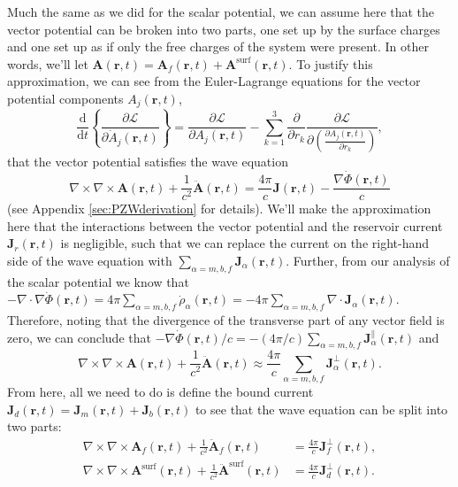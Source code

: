 \documentclass{article}
\begin{document}
Much the same as we did for the scalar potential, we can assume here that the vector potential can be broken into two parts, one set up by the surface charges and one set up as if only the free charges of the system were present. In other words, we'll let $\mathbf{A}(\mathbf{r},t) = \mathbf{A}_f(\mathbf{r},t) + \mathbf{A}^\mathrm{surf}(\mathbf{r},t)$. To justify this approximation, we can see from the Euler-Lagrange equations for the vector potential components $A_j(\mathbf{r},t)$,
\begin{equation}
\frac{\mathrm{d}}{\mathrm{d}t}\left\{\frac{\partial \mathcal{L}}{\partial \dot{A}_j(\mathbf{r},t)}\right\} = \frac{\partial \mathcal{L}}{\partial A_j(\mathbf{r},t)} - \sum_{k = 1}^3\frac{\partial}{\partial r_k}\frac{\partial \mathcal{L}}{\partial\!\left(\frac{\partial A_j(\mathbf{r},t)}{\partial r_k}\right)},
\end{equation}
that the vector potential satisfies the wave equation
\begin{equation}
\nabla\times\nabla\times\mathbf{A}(\mathbf{r},t) + \frac{1}{c^2}\ddot{\mathbf{A}}(\mathbf{r},t) = \frac{4\pi}{c}\mathbf{J}(\mathbf{r},t) - \frac{\nabla\dot{\Phi}(\mathbf{r},t)}{c}
\end{equation}
(see Appendix \ref{sec:PZWderivation} for details). We'll make the approximation here that the interactions between the vector potential and the reservoir current $\mathbf{J}_r(\mathbf{r},t)$ is negligible, such that we can replace the current on the right-hand side of the wave equation with $\sum_{\alpha = m,b,f}\mathbf{J}_\alpha(\mathbf{r},t)$. Further, from our analysis of the scalar potential we know that $-\nabla\cdot\nabla\dot{\Phi}(\mathbf{r},t) = 4\pi\sum_{\alpha = m,b,f}\dot{\rho}_\alpha(\mathbf{r},t) = -4\pi\sum_{\alpha = m,b,f}\nabla\cdot\mathbf{J}_\alpha(\mathbf{r},t)$. Therefore, noting that the divergence of the transverse part of any vector field is zero, we can conclude that $-\nabla\dot{\Phi}(\mathbf{r},t)/c = -(4\pi/c)\sum_{\alpha = m,b,f}\mathbf{J}^\parallel_\alpha(\mathbf{r},t)$ and
\begin{equation}
\nabla\times\nabla\times\mathbf{A}(\mathbf{r},t) + \frac{1}{c^2}\ddot{\mathbf{A}}(\mathbf{r},t) \approx \frac{4\pi}{c}\sum_{\alpha = m,b,f}\mathbf{J}^\perp_{\alpha}(\mathbf{r},t).
\end{equation}
From here, all we need to do is define the bound current $\mathbf{J}_d(\mathbf{r},t) = \mathbf{J}_m(\mathbf{r},t) + \mathbf{J}_b(\mathbf{r},t)$ to see that the wave equation can be split into two parts:
\begin{equation}\label{eq:vectorPotentialSplit}
\begin{split}
\nabla\times\nabla\times\mathbf{A}_f(\mathbf{r},t) + \frac{1}{c^2}\ddot{\mathbf{A}}_f(\mathbf{r},t) &= \frac{4\pi}{c}\mathbf{J}^\perp_f(\mathbf{r},t),\\
\nabla\times\nabla\times\mathbf{A}^\mathrm{surf}(\mathbf{r},t) + \frac{1}{c^2}\ddot{\mathbf{A}}^\mathrm{surf}(\mathbf{r},t) &= \frac{4\pi}{c}\mathbf{J}^\perp_d(\mathbf{r},t).
\end{split}
\end{equation}
\end{document}
